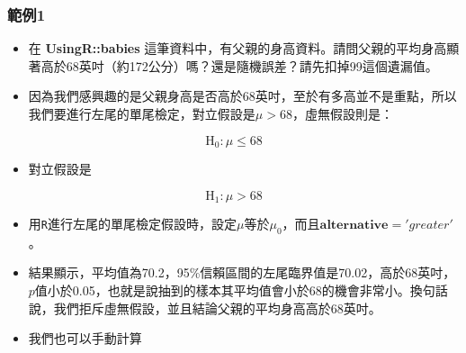 \documentclass[hyperref,]{ctexart}
\newenvironment{Shaded}{\begin{snugshade}}{\end{snugshade}}
\newcommand{\CommentTok}[1]{\textcolor[rgb]{0.56,0.35,0.01}{\textit{#1}}}
\newcommand{\DataTypeTok}[1]{\textcolor[rgb]{0.13,0.29,0.53}{#1}}
\newcommand{\DecValTok}[1]{\textcolor[rgb]{0.00,0.00,0.81}{#1}}
\newcommand{\KeywordTok}[1]{\textcolor[rgb]{0.13,0.29,0.53}{\textbf{#1}}}
\newcommand{\NormalTok}[1]{#1}
\newcommand{\OperatorTok}[1]{\textcolor[rgb]{0.81,0.36,0.00}{\textbf{#1}}}
\newcommand{\StringTok}[1]{\textcolor[rgb]{0.31,0.60,0.02}{#1}}
\providecommand{\tightlist}{%
  \setlength{\itemsep}{0pt}\setlength{\parskip}{0pt}}
\begin{document}
\hypertarget{ux7bc4ux4f8b1}{%
\subsubsection{範例1}\label{ux7bc4ux4f8b1}}

\begin{itemize}
\item
  在 \textbf{UsingR::babies}
  這筆資料中，有父親的身高資料。請問父親的平均身高顯著高於68英吋（約172公分）嗎？還是隨機誤差？請先扣掉99這個遺漏值。
\item
  因為我們感興趣的是父親身高是否高於68英吋，至於有多高並不是重點，所以我們要進行左尾的單尾檢定，對立假設是\(\mu >68\)，虛無假設則是：
\end{itemize}

\[\text{H}_{\text{0}}: \mu \leq 68\]

\begin{itemize}
\tightlist
\item
  對立假設是
\end{itemize}

\[\text{H}_{\text{1}}:\mu > 68 \]

\begin{itemize}
\tightlist
\item
  用\texttt{R}進行左尾的單尾檢定假設時，設定\(\mu\)等於\(\mu_{0}\)，而且\(\textbf{alternative}='greater'\)。
\end{itemize}

\begin{Shaded}
\end{Shaded}

\begin{itemize}
\item
  結果顯示，平均值為70.2，95\%信賴區間的左尾臨界值是70.02，高於68英吋，\(p\)值小於0.05，也就是說抽到的樣本其平均值會小於68的機會非常小。換句話說，我們拒斥虛無假設，並且結論父親的平均身高高於68英吋。
\item
  我們也可以手動計算
\end{itemize}
\end{document}
